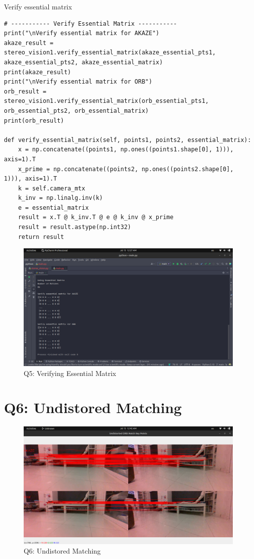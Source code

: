 \documentclass[a4paper, 12pt]{article}
\begin{document}
    Verify essential matrix
    \begin{lstlisting}
# ----------- Verify Essential Matrix -----------
print("\nVerify essential matrix for AKAZE")
akaze_result = stereo_vision1.verify_essential_matrix(akaze_essential_pts1, akaze_essential_pts2, akaze_essential_matrix)
print(akaze_result)
print("\nVerify essential matrix for ORB")
orb_result = stereo_vision1.verify_essential_matrix(orb_essential_pts1, orb_essential_pts2, orb_essential_matrix)
print(orb_result)

def verify_essential_matrix(self, points1, points2, essential_matrix):
    x = np.concatenate((points1, np.ones((points1.shape[0], 1))), axis=1).T
    x_prime = np.concatenate((points2, np.ones((points2.shape[0], 1))), axis=1).T
    k = self.camera_mtx
    k_inv = np.linalg.inv(k)
    e = essential_matrix
    result = x.T @ k_inv.T @ e @ k_inv @ x_prime
    result = result.astype(np.int32)
    return result
    \end{lstlisting}

    \begin{figure}
		\caption{Q5: Verifying Essential Matrix}
		\includegraphics[scale=0.25]{img/essential_matrix3.png}
	\end{figure}
    
    \section{Q6: Undistored Matching}

    \begin{figure}
		\caption{Q6: Undistored Matching}
		\includegraphics[scale=0.25]{img/undistorted_matching.png}
	\end{figure}
\end{document}
